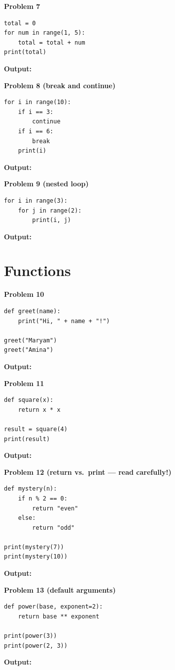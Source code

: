 \documentclass[11pt]{article}
\newcommand{\answerbox}{%
\vspace{2mm}
\noindent\textbf{Output:}
\vspace{14mm}
}
\begin{document}
\vspace{4mm}
\noindent\textbf{Problem 7}
\begin{lstlisting}
total = 0
for num in range(1, 5):
    total = total + num
print(total)
\end{lstlisting}
\answerbox

\vspace{4mm}
\noindent\textbf{Problem 8 (break and continue)}
\begin{lstlisting}
for i in range(10):
    if i == 3:
        continue
    if i == 6:
        break
    print(i)
\end{lstlisting}
\answerbox

\vspace{4mm}
\noindent\textbf{Problem 9 (nested loop)}
\begin{lstlisting}
for i in range(3):
    for j in range(2):
        print(i, j)
\end{lstlisting}
\answerbox

\newpage
\section{Functions}

\vspace{4mm}
\noindent\textbf{Problem 10}
\begin{lstlisting}
def greet(name):
    print("Hi, " + name + "!")

greet("Maryam")
greet("Amina")
\end{lstlisting}
\answerbox

\vspace{4mm}
\noindent\textbf{Problem 11}
\begin{lstlisting}
def square(x):
    return x * x

result = square(4)
print(result)
\end{lstlisting}
\answerbox

\vspace{4mm}
\noindent\textbf{Problem 12 (return vs.\ print --- read carefully!)}
\begin{lstlisting}
def mystery(n):
    if n % 2 == 0:
        return "even"
    else:
        return "odd"

print(mystery(7))
print(mystery(10))
\end{lstlisting}
\answerbox

\vspace{4mm}
\noindent\textbf{Problem 13 (default arguments)}
\begin{lstlisting}
def power(base, exponent=2):
    return base ** exponent

print(power(3))
print(power(2, 3))
\end{lstlisting}
\answerbox
\end{document}
